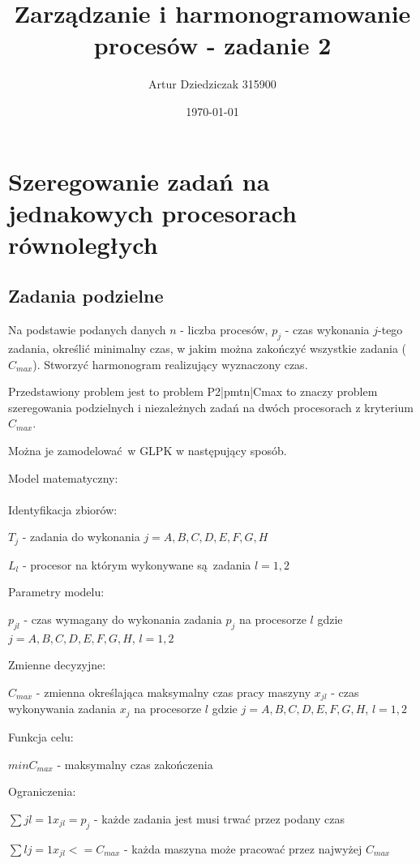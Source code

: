 \documentclass{article}
\title{Zarządzanie i harmonogramowanie procesów - zadanie 2}
\author{Artur Dziedziczak 315900}
\date{\today}
\begin{document}
\maketitle

\section {Szeregowanie zadań na jednakowych procesorach równoległych}
\subsection{Zadania podzielne}

Na podstawie podanych danych \(n\) - liczba procesów,
\(p_j\) - czas wykonania \(j\)-tego zadania, określić minimalny czas,
w jakim można zakończyć wszystkie zadania (\(C_{max}\)).
Stworzyć harmonogram realizujący wyznaczony czas.

Przedstawiony problem jest to problem P2|pmtn|Cmax to znaczy problem szeregowania podzielnych i niezależnych zadań na dwóch procesorach z kryterium $C_{max}$.

Można je zamodelować w GLPK w następujący sposób.

\noindent Model matematyczny: \\\\

\noindent Identyfikacja zbiorów:

$T_j$ - zadania do wykonania $j = {A,B,C,D,E,F,G,H}$

$L_{l}$ - procesor na którym wykonywane są zadania $l = {1,2}$

\noindent Parametry modelu:

$p_{jl}$ - czas wymagany do wykonania zadania $p_j$ na procesorze $l$ gdzie $j = {A,B,C,D,E,F,G,H}$, $l = {1,2}$

\noindent Zmienne decyzyjne:

$C_{max}$ - zmienna określająca maksymalny czas pracy maszyny
$x_{jl}$ - czas wykonywania zadania $x_j$ na procesorze $l$ gdzie $j = {A,B,C,D,E,F,G,H}$, $l = {1,2}$

\noindent Funkcja celu:

$min C_{max}$ - maksymalny czas zakończenia

\noindent Ograniczenia:

$\sum{j}{l = 1} x_{jl} = p_j$ - każde zadania jest musi trwać przez podany czas 

$\sum{l}{j = 1} x_{jl} <= C_{max}$ - każda maszyna może pracować przez najwyżej $C_{max}$
\end{document}
